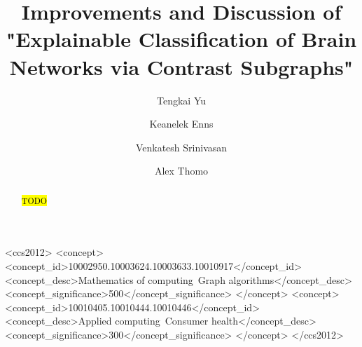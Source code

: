 \documentclass[sigconf]{acmart}
\begin{document}
\graphicspath{ {./img/} }


\title[Contrast Subgraphs of Brain Networks]{Improvements and Discussion of "Explainable Classification of Brain Networks via Contrast Subgraphs"}

\author{Tengkai Yu}

\author{Keanelek Enns}

\author{Venkatesh Srinivasan}

\author{Alex Thomo}

\renewcommand{\shortauthors}{T. Yu and K. Enns}

\begin{abstract}
\hl{TODO}
\end{abstract}

\begin{CCSXML}
<ccs2012>
   <concept>
       <concept_id>10002950.10003624.10003633.10010917</concept_id>
       <concept_desc>Mathematics of computing~Graph algorithms</concept_desc>
       <concept_significance>500</concept_significance>
       </concept>
   <concept>
       <concept_id>10010405.10010444.10010446</concept_id>
       <concept_desc>Applied computing~Consumer health</concept_desc>
       <concept_significance>300</concept_significance>
       </concept>
 </ccs2012>
\end{CCSXML}
\end{document}
